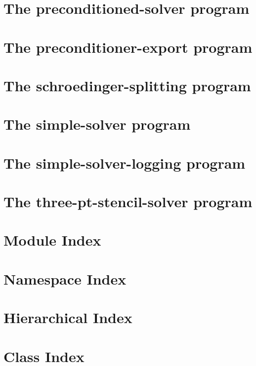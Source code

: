 \let\mypdfximage\pdfximage\def\pdfximage{\immediate\mypdfximage}\documentclass[twoside]{book}
\newcommand{\+}{\discretionary{\mbox{\scriptsize$\hookleftarrow$}}{}{}}
\begin{document}
\chapter{The preconditioned-\/solver program}
\label{preconditioned_solver}

\chapter{The preconditioner-\/export program}
\label{preconditioner_export}

\chapter{The schroedinger-\/splitting program}
\label{schroedinger_splitting}

\chapter{The simple-\/solver program}
\label{simple_solver}

\chapter{The simple-\/solver-\/logging program}
\label{simple_solver_logging}

\chapter{The three-\/pt-\/stencil-\/solver program}
\label{three_pt_stencil_solver}

\chapter{Module Index}

\chapter{Namespace Index}

\chapter{Hierarchical Index}

\chapter{Class Index}

\end{document}
